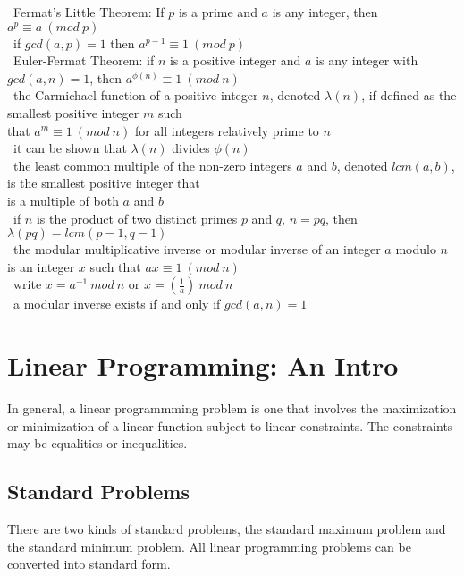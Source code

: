 \documentclass[10pt,letterpaper]{scrartcl}
\newcommand{\tbul}{\textbullet}
\newcommand{\tend}{\>\textendash}
\begin{document}
\begin{tabbing}
\tbul\ Fermat's Little Theorem: If $p$ is a prime and $a$ is any integer, then $a^p\equiv a\ (mod\ p)$ \\
    \tend\ if $gcd(a, p)=1$ then $a^{p-1}\equiv 1\ (mod\ p)$ \\
\tbul\ Euler-Fermat Theorem: if $n$ is a positive integer and $a$ is any integer with $gcd(a,n)=1$, then $a^{\phi (n)}\equiv 1\ (mod\ n)$ \\
\tbul\ the Carmichael function of a positive integer $n$, denoted $\lambda (n)$, if defined as the smallest positive integer $m$ such \\ that $a^m\equiv 1\ (mod\ n)$ for all integers relatively prime to $n$ \\
    \tend\ it can be shown that $\lambda (n)$ divides $\phi (n)$ \\
\tbul\ the least common multiple of the non-zero integers $a$ and $b$, denoted $lcm(a,b)$, is the smallest positive integer that \\ is a multiple of both $a$ and $b$ \\
\tbul\ if $n$ is the product of two distinct primes $p$ and $q$, $n=pq$, then $\lambda (pq)=lcm(p-1, q-1)$ \\
\tbul\ the modular multiplicative inverse or modular inverse of an integer $a$ modulo $n$ is an integer $x$ such that $ax\equiv 1\ (mod\ n)$ \\
    \tend\ write $x = a^{-1}\ mod\ n$ or $x=(\frac{1}{a})\ mod\ n$ \\
    \tend\ a modular inverse exists if and only if $gcd(a, n)=1$ 
\end{tabbing}

\newpage\section{Linear Programming: An Intro}
In general, a linear programmming problem is one that involves the maximization or minimization of a linear function subject to linear constraints. The constraints may be equalities or inequalities. 
\subsection{Standard Problems}
There are two kinds of standard problems, the standard maximum problem and the standard minimum problem. All linear programming problems can be converted into standard form. 
\end{document}
